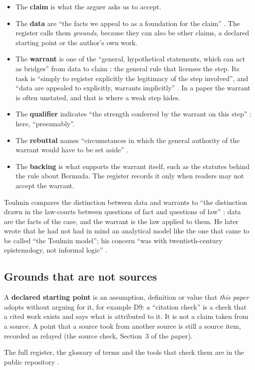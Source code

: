 \begin{itemize}
\item The \textbf{claim} is what the arguer asks us to accept.
\item The \textbf{data} are ``the facts we appeal to as a foundation for
  the claim'' \citep[p.~90]{toulmin2003}.  The register calls them
  \emph{grounds}, because they can also be other claims, a declared
  starting point or the author's own work.
\item The \textbf{warrant} is one of the ``general, hypothetical statements,
  which can act as bridges'' from data to claim \citep[p.~91]{toulmin2003}:
  the general rule that licenses the step.  Its task is ``simply to register
  explicitly the legitimacy of the step involved'', and ``data are appealed
  to explicitly, warrants implicitly'' \citep[p.~92]{toulmin2003}.  In a
  paper the warrant is often unstated, and that is where a weak step hides.
\item The \textbf{qualifier} indicates ``the strength conferred by the warrant
  on this step'' \citep[p.~94]{toulmin2003}: here, ``presumably''.
\item The \textbf{rebuttal} names ``circumstances in which the general
  authority of the warrant would have to be set aside''
  \citep[p.~94]{toulmin2003}.
\item The \textbf{backing} is what supports the warrant itself, such as the
  statutes behind the rule about Bermuda.  The register records it only when
  readers may not accept the warrant.
\end{itemize}

Toulmin compares the distinction between data and warrants to ``the
distinction drawn in the law-courts between questions of fact and questions
of law'' \citep[p.~92]{toulmin2003}: data are the facts of the case, and the
warrant is the law applied to them.  He later wrote that he had not had in
mind an analytical model like the one that came to be called ``the Toulmin
model''; his concern ``was with twentieth-century epistemology, not informal
logic'' \citep[p.~vii]{toulmin2003}.

\subsection{Grounds that are not sources}

A \textbf{declared starting point} is an assumption, definition or value that
\emph{this paper} adopts without arguing for it, for example D9: a ``citation check'' is a check that a cited work exists and says what is attributed to it.  It is not a
claim taken from a source.  A point that a source took from another source
is still a source item, recorded as relayed (the source check, Section~3 of
the paper).

The full register, the glossary of terms and the tools that check them are
in the public repository \citep{veen2026repo}.
